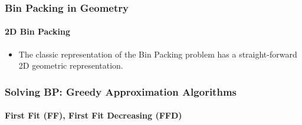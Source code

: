 \documentclass[10pt,    %
    english,            %
    xcolor=table,       %
    envcountsect,        %
    aspectratio=169     %
]{beamer}
\begin{document}
\begin{frame}
    \frametitle{Bin Packing in Geometry}
    \framesubtitle{2D Bin Packing}
    
    \begin{itemize}
        \item The classic representation of the Bin Packing problem has a straight-forward 2D geometric representation.
    \end{itemize}

    \vspace{-10pt}

    \begin{figure}
        \centering
    \end{figure}
\end{frame}


\begin{frame}
    \frametitle{Solving BP: Greedy Approximation Algorithms}
    \framesubtitle{First Fit (FF), First Fit Decreasing (FFD)}

    \begin{columns}
        \begin{column}{.45\textwidth}
        \end{column}
        \begin{column}{.45\textwidth}
        \end{column}
    \end{columns}
\end{frame}
\end{document}
